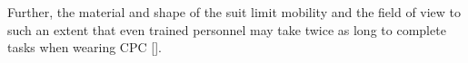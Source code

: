 Further, the material and shape of the suit limit mobility and the field of view to such an extent that even trained personnel may take twice as long to complete tasks when wearing CPC [\cite{murrayEffectsChemicalProtective2011}].

